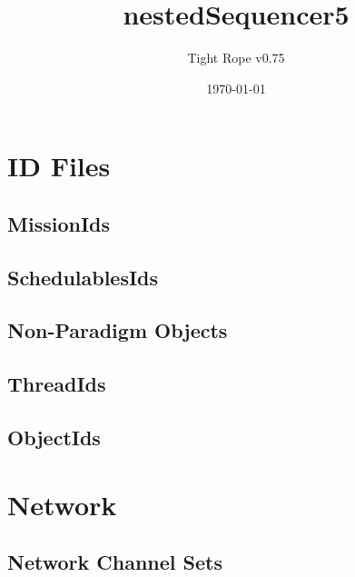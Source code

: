 \documentclass[10pt,a4paper]{article}
\title{nestedSequencer5}
\author{Tight Rope v0.75}
\date{\today}
\begin{document}
\maketitle

\section{ID Files}
\subsection{MissionIds}

\newpage

\subsection{SchedulablesIds}

\newpage

\subsection{Non-Paradigm Objects}
\newpage

\subsection{ThreadIds}

\newpage

\subsection{ObjectIds}

\newpage

\section{Network}
\subsection{Network Channel Sets}




{}
\end{document}

